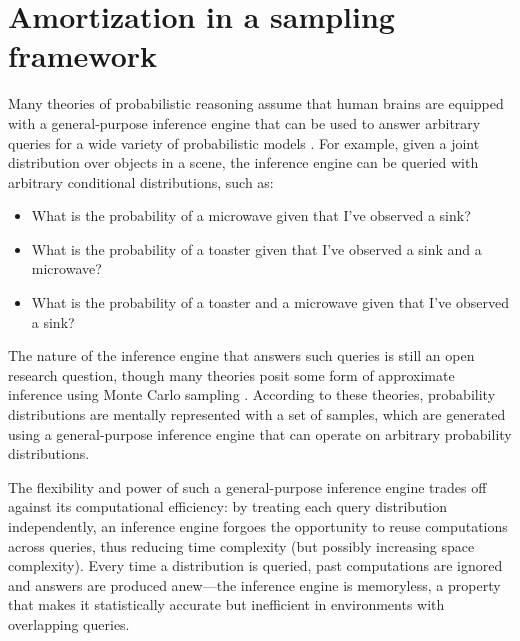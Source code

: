
\chapter{Amortization in a sampling framework}

Many theories of probabilistic reasoning assume that human brains are equipped with a general-purpose inference engine that can be used to answer arbitrary queries for a wide variety of probabilistic models \citep{griffiths2012bridging, oaksford2007bayesian}. For example, given a joint distribution over objects in a scene, the inference engine can be queried with arbitrary conditional distributions, such as:
\begin{itemize}
\item What is the probability of a microwave given that I've observed a sink?
\item What is the probability of a toaster given that I've observed a sink and a microwave?
\item What is the probability of a toaster and a microwave given that I've observed a sink?
\end{itemize}

The nature of the inference engine that answers such queries is still an open research question, though many theories posit some form of approximate inference using Monte Carlo sampling \citep[e.g.,][]{thaker17,dasgupta17,vul2014one,gershman12,denison13,sanborn2016bayesian,ullman2012theory}. According to these theories, probability distributions are mentally represented with a set of samples, which are generated using a general-purpose inference engine that can operate on arbitrary probability distributions.

The flexibility and power of such a general-purpose inference engine trades off against its computational efficiency: by treating each query distribution independently, an inference engine forgoes the opportunity to reuse computations across queries, thus reducing time complexity (but possibly increasing space complexity). Every time a distribution is queried, past computations are ignored and answers are produced anew---the inference engine is memoryless, a property that makes it statistically accurate but inefficient in environments with overlapping queries.

